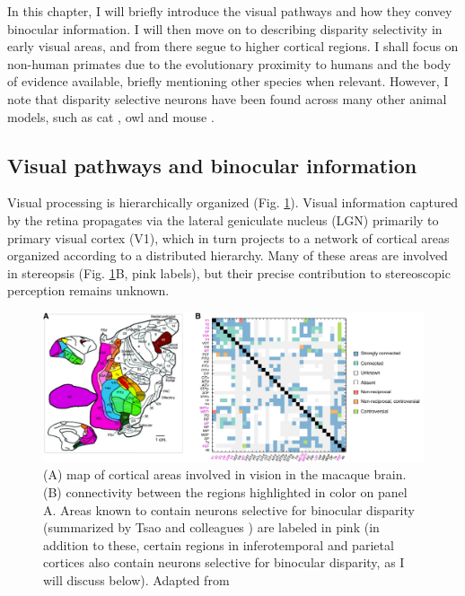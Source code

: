 In this chapter, I will briefly introduce the visual pathways and how they convey binocular information. I will then move on to describing disparity selectivity in early visual areas, and from there segue to higher cortical regions. I shall focus on non-human primates due to the evolutionary proximity to humans and the body of evidence available, briefly mentioning other species when relevant. However, I note that disparity selective neurons have been found across many other animal models, such as cat \cite{Barlow:1967bs}, owl \cite{Pettigrew:1976uq} and mouse \cite{Scholl:2013br}.

\subsection{Visual pathways and binocular information} \label{ssec:pathways}

Visual processing is hierarchically organized \cite{Felleman:1991kg} (Fig. \ref{fig:viscortex}). Visual information captured by the retina propagates via the lateral geniculate nucleus (LGN) primarily to primary visual cortex (V1), which in turn projects to a network of cortical areas organized according to a distributed hierarchy. Many of these areas are involved in stereopsis (Fig. \ref{fig:viscortex}B, pink labels), but their precise contribution to stereoscopic perception remains unknown.

\begin{figure}
  \centering
  \includegraphics[width=14cm, keepaspectratio]{visual-cortex}
  \caption[Distributed cortical hierarchy.]{(A) map of cortical areas involved in vision in the macaque brain. (B) connectivity between the regions highlighted in color on panel A. Areas known to contain neurons selective for binocular disparity (summarized by Tsao and colleagues \cite{Tsao:2003lk}) are labeled in pink (in addition to these, certain regions in inferotemporal and parietal cortices also contain neurons selective for binocular disparity, as I will discuss below). Adapted from \cite{Felleman:1991kg}}
  \label{fig:viscortex}
\end{figure}

